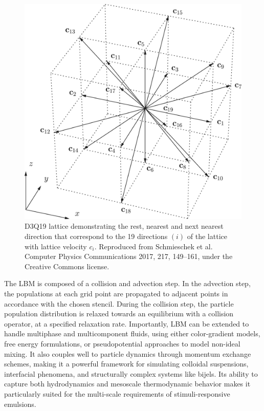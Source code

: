 \begin{figure}[h]
    \centering
    \includegraphics[scale = 1]{figures/methods/d3q19_lattice.jpg}
    \caption{D3Q19 lattice demonstrating the rest, nearest and next nearest direction that correspond to the 19 
    directions $(i)$ of the lattice with lattice velocity $c_{i}$. \cite{schmieschek_lb3d_2017} Reproduced from 
    Schmieschek et al. Computer Physics Communications 2017, 217, 149--161, under the Creative Commons license.}
    \label{fig:d3q19_lattice}
\end{figure}

The LBM is composed of a collision and advection step. In the advection step, the populations at each grid point are propagated to adjacent points in accordance 
with the chosen stencil. During the collision step, the particle population distribution is relaxed towards an equilibrium with a collision operator, at a 
specified relaxation rate. Importantly, LBM can be extended to handle multiphase and multicomponent fluids, using either color-gradient models, free energy formulations, 
or pseudopotential approaches to model non-ideal mixing. It also couples well to particle dynamics through momentum exchange schemes, making it a powerful framework for 
simulating colloidal suspensions, interfacial phenomena, and structurally complex systems like bijels. Its ability to capture both hydrodynamics and mesoscale thermodynamic 
behavior makes it particularly suited for the multi-scale requirements of stimuli-responsive emulsions.

